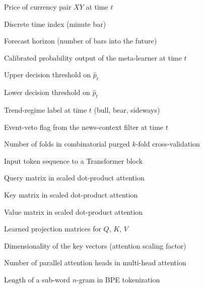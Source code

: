 \begin{simbolos}
  \item[$P_{XY,t}$] Price of currency pair $XY$ at time $t$
  \item[$t$] Discrete time index (minute bar)
  \item[$H$] Forecast horizon (number of bars into the future)
  \item[$\hat{p}_t$] Calibrated probability output of the meta-learner at time $t$
  \item[$\theta_{\text{high}}$] Upper decision threshold on $\hat{p}_t$
  \item[$\theta_{\text{low}}$] Lower decision threshold on $\hat{p}_t$
  \item[$r_t$] Trend-regime label at time $t$ (bull, bear, sideways)
  \item[$v_t$] Event-veto flag from the news-context filter at time $t$
  \item[$k$] Number of folds in combinatorial purged $k$-fold cross-validation
  \item[$X$] Input token sequence to a Transformer block
  \item[$Q$] Query matrix in scaled dot-product attention
  \item[$K$] Key matrix in scaled dot-product attention
  \item[$V$] Value matrix in scaled dot-product attention
  \item[$W^Q, W^K, W^V$] Learned projection matrices for $Q$, $K$, $V$
  \item[$d_k$] Dimensionality of the key vectors (attention scaling factor)
  \item[$h$] Number of parallel attention heads in multi-head attention
  \item[$n$] Length of a sub-word $n$-gram in BPE tokenization
\end{simbolos}
